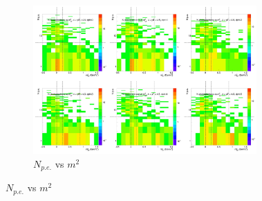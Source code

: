 \begin{figure}[H]
  \centering
    \begin{subfigure}{1\textwidth}
   \centering
   \includegraphics[width=0.94\textwidth]{hiptfits/pos/PSaccthreshold_cent0_ich1_accfire0_ptbin14.jpg}
    \caption{$N_{p.e.}$ vs $m^2$}
    \end{subfigure}
\end{figure}
